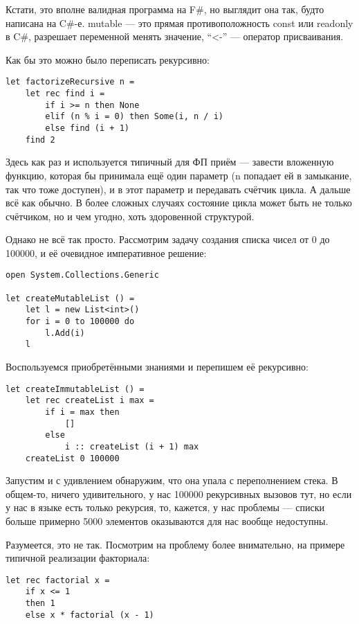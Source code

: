 \documentclass[a5paper]{article}
\begin{document}
Кстати, это вполне валидная программа на F\#, но выглядит она так, будто написана на C\#-е. mutable --- это прямая противоположность const или readonly в C\#, разрешает переменной менять значение, ``<-'' --- оператор присваивания.

Как бы это можно было переписать рекурсивно:

\begin{verbatim}
let factorizeRecursive n =
    let rec find i =
        if i >= n then None
        elif (n % i = 0) then Some(i, n / i)
        else find (i + 1)
    find 2
\end{verbatim}

Здесь как раз и используется типичный для ФП приём --- завести вложенную функцию, которая бы принимала ещё один параметр (n попадает ей в замыкание, так что тоже доступен), и в этот параметр и передавать счётчик цикла. А дальше всё как обычно. В более сложных случаях состояние цикла может быть не только счётчиком, но и чем угодно, хоть здоровенной структурой.

Однако не всё так просто. Рассмотрим задачу создания списка чисел от 0 до 100000, и её очевидное императивное решение:

\begin{verbatim}
open System.Collections.Generic

let createMutableList () =
    let l = new List<int>()
    for i = 0 to 100000 do
        l.Add(i)
    l
\end{verbatim}

Воспользуемся приобретёнными знаниями и перепишем её рекурсивно:

\begin{verbatim}
let createImmutableList () =
    let rec createList i max =
        if i = max then
            []
        else
            i :: createList (i + 1) max
    createList 0 100000
\end{verbatim}

Запустим и с удивлением обнаружим, что она упала с переполнением стека. В общем-то, ничего удивительного, у нас 100000 рекурсивных вызовов тут, но если у нас в языке есть только рекурсия, то, кажется, у нас проблемы --- списки больше примерно 5000 элементов оказываются для нас вообще недоступны.

Разумеется, это не так. Посмотрим на проблему более внимательно, на примере типичной реализации факториала:

\begin{verbatim}
let rec factorial x =
    if x <= 1
    then 1 
    else x * factorial (x - 1)
\end{verbatim}
\end{document}
